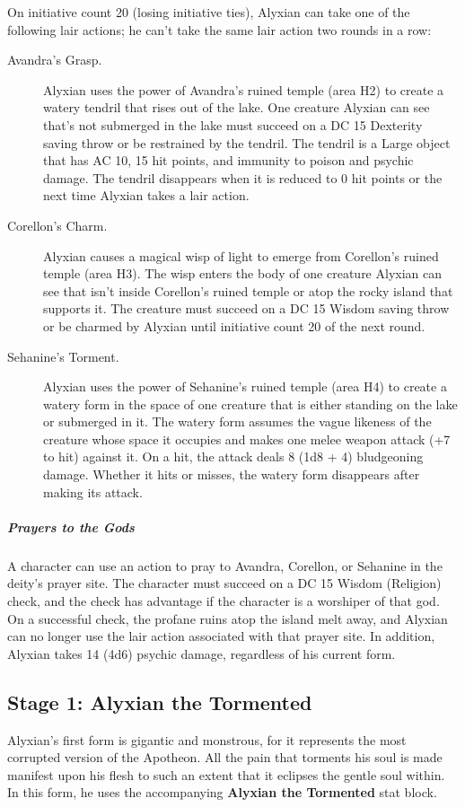 \documentclass[10pt,a4paper,twoside,bg=print,twocolumn,openany,nodeprecatedcode]{dndbook}
\begin{document}
On initiative count 20 (losing initiative ties), Alyxian can take one of the following lair actions; he can't take the same lair action two rounds in a row:


\begin{description}
\item[Avandra's Grasp.]
Alyxian uses the power of Avandra's ruined temple (area H2) to create a watery tendril that rises out of the lake. One creature Alyxian can see that's not submerged in the lake must succeed on a DC 15 Dexterity saving throw or be restrained by the tendril. The tendril is a Large object that has AC 10, 15 hit points, and immunity to poison and psychic damage. The tendril disappears when it is reduced to 0 hit points or the next time Alyxian takes a lair action.
\item[Corellon's Charm.]
Alyxian causes a magical wisp of light to emerge from Corellon's ruined temple (area H3). The wisp enters the body of one creature Alyxian can see that isn't inside Corellon's ruined temple or atop the rocky island that supports it. The creature must succeed on a DC 15 Wisdom saving throw or be charmed by Alyxian until initiative count 20 of the next round.
\item[Sehanine's Torment.]
Alyxian uses the power of Sehanine's ruined temple (area H4) to create a watery form in the space of one creature that is either standing on the lake or submerged in it. The watery form assumes the vague likeness of the creature whose space it occupies and makes one melee weapon attack (+7 to hit) against it. On a hit, the attack deals 8 (1d8 + 4) bludgeoning damage. Whether it hits or misses, the watery form disappears after making its attack.
\end{description}

\subparagraph{Prayers to the Gods}
A character can use an action to pray to Avandra, Corellon, or Sehanine in the deity's prayer site. The character must succeed on a DC 15 Wisdom (Religion) check, and the check has advantage if the character is a worshiper of that god. On a successful check, the profane ruins atop the island melt away, and Alyxian can no longer use the lair action associated with that prayer site. In addition, Alyxian takes 14 (4d6) psychic damage, regardless of his current form.

\subsection{Stage 1: Alyxian the Tormented}
Alyxian's first form is gigantic and monstrous, for it represents the most corrupted version of the Apotheon. All the pain that torments his soul is made manifest upon his flesh to such an extent that it eclipses the gentle soul within. In this form, he uses the accompanying \textbf{Alyxian the Tormented} stat block.
\end{document}
